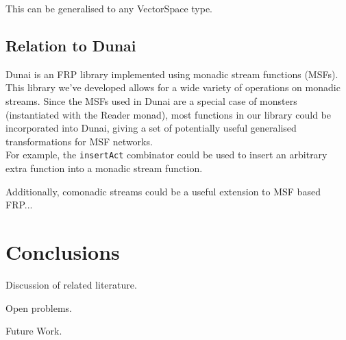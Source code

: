 \documentclass{article}
\begin{document}
This can be generalised to any VectorSpace type.

\subsection{Relation to Dunai}

Dunai \cite{frp_refactored} is an FRP library implemented using monadic stream functions (MSFs). \\

This library we've developed allows for a wide variety of operations on monadic streams. Since the MSFs used in Dunai are a special case of monsters (instantiated with the Reader monad), most functions in our library could be incorporated into Dunai, giving a set of potentially useful generalised transformations for MSF networks. \\

For example, the \verb+insertAct+ combinator could be used to insert an arbitrary extra function into a monadic stream function.

Additionally, comonadic streams could be a useful extension to MSF based FRP...

\section{Conclusions}

Discussion of related literature.

Open problems.

Future Work.


\end{document}
